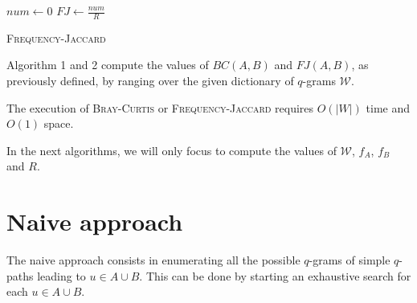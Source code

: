 \begin{algorithm}[h]
	\small
	\DontPrintSemicolon
	\BlankLine
	$num \gets 0$\;
	$FJ \gets \frac{num}{R}$\;
	\caption{\textsc{Frequency-Jaccard}}
	\label{alg:jaccard}
\end{algorithm}

Algorithm 1 and 2 compute the values of $BC(A,B)$ and $FJ(A,B)$, as previously defined, by ranging over the given dictionary of $q$-grams $\mathcal{W}$.

\begin{lemma}
	The execution of \textsc{Bray-Curtis} or \textsc{Frequency-Jaccard} requires $O(|W|)$ time and $O(1)$ space. 	
\end{lemma}

In the next algorithms, we will only focus to compute the values of $\mathcal{W}$, $f_{A}$, $f_{B}$ and $R$.

\clearpage 

\section{Naive approach}

The naive approach consists in enumerating all the possible $q$-grams of simple $q$-paths leading to $u \in A \cup B$. This can be done by starting an exhaustive search for each $u \in A \cup B$.
	
